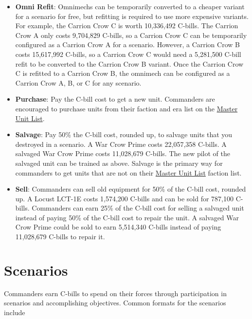 \documentclass[UTF8]{article}
\begin{document}
\begin{itemize}
\item {\bf Omni Refit}: Omnimechs can be temporarily converted to a cheaper variant for a scenario for free, but refitting is required to use more expensive variants.
For example, the Carrion Crow C is worth 10,336,492 C-bills.
The Carrion Crow A only costs 9,704,829 C-bills, so a Carrion Crow C can be temporarily configured as a Carrion Crow A for a scenario.
However, a Carrion Crow B costs 15,617,992 C-bills, so a Carrion Crow C would need a 5,281,500 C-bill refit to be converted to the Carrion Crow B variant.
Once the Carrion Crow C is refitted to a Carrion Crow B, the omnimech can be configured as a Carrion Crow A, B, or C for any scenario.

\item {\bf Purchase}: Pay the C-bill cost to get a new unit.
Commanders are encouraged to purchase units from their faction and era list on the \href{http://www.masterunitlist.info/}{Master Unit List}.

\item {\bf Salvage}: Pay 50\% the C-bill cost, rounded up, to salvage units that you destroyed in a scenario.
A War Crow Prime costs 22,057,358 C-bills.
A salvaged War Crow Prime costs 11,028,679 C-bills.
The new pilot of the salvaged unit can be trained as above.
Salvage is the primary way for commanders to get units that are not on their \href{http://www.masterunitlist.info/}{Master Unit List} faction list.

\item {\bf Sell}: Commanders can sell old equipment for 50\% of the C-bill cost, rounded up.
A Locust LCT-1E costs 1,574,200 C-bills and can be sold for 787,100 C-bills.
Commanders can earn 25\% of the C-bill cost for selling a salvaged unit instead of paying 50\% of the C-bill cost to repair the unit.
A salvaged War Crow Prime could be sold to earn 5,514,340 C-bills instead of paying 11,028,679 C-bills to repair it.

\end{itemize}

\newpage

\section{Scenarios}

Commanders earn C-bills to spend on their forces through participation in scenarios and accomplishing objectives.
Common formats for the scenarios include
\end{document}
